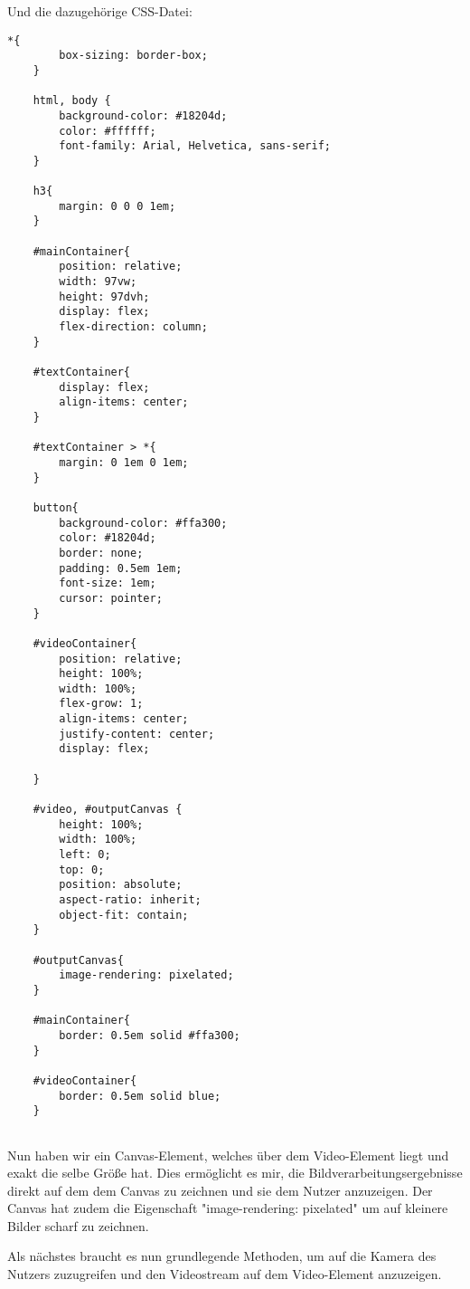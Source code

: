 Und die dazugehörige CSS-Datei:

\begin{lstlisting}[style=CSS]
    *{
        box-sizing: border-box;
    }
    
    html, body {
        background-color: #18204d;
        color: #ffffff;
        font-family: Arial, Helvetica, sans-serif;
    }
    
    h3{
        margin: 0 0 0 1em;
    }
    
    #mainContainer{
        position: relative;
        width: 97vw;
        height: 97dvh;
        display: flex;
        flex-direction: column;
    }
    
    #textContainer{
        display: flex;
        align-items: center;
    }
    
    #textContainer > *{
        margin: 0 1em 0 1em;
    }
    
    button{
        background-color: #ffa300;
        color: #18204d;
        border: none;
        padding: 0.5em 1em;
        font-size: 1em;
        cursor: pointer;
    }
    
    #videoContainer{
        position: relative;
        height: 100%;
        width: 100%;
        flex-grow: 1;
        align-items: center;
        justify-content: center;
        display: flex;
    
    }
    
    #video, #outputCanvas {
        height: 100%;
        width: 100%;
        left: 0;
        top: 0;
        position: absolute;
        aspect-ratio: inherit;
        object-fit: contain;
    }
    
    #outputCanvas{
        image-rendering: pixelated;
    }
    
    #mainContainer{
        border: 0.5em solid #ffa300;
    }
    
    #videoContainer{
        border: 0.5em solid blue;
    }
    
\end{lstlisting}

Nun haben wir ein Canvas-Element, welches über dem Video-Element liegt und exakt die selbe Größe hat. Dies ermöglicht es mir, die Bildverarbeitungsergebnisse direkt auf dem dem Canvas zu zeichnen und sie dem Nutzer anzuzeigen. Der Canvas hat zudem die Eigenschaft "image-rendering: pixelated" um auf kleinere Bilder scharf zu zeichnen.

Als nächstes braucht es nun grundlegende Methoden, um auf die Kamera des Nutzers zuzugreifen und den Videostream auf dem Video-Element anzuzeigen.

